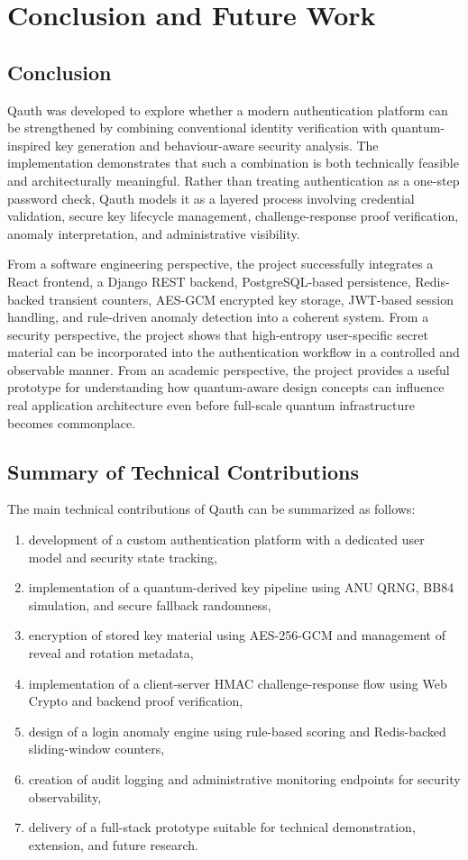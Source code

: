 \chapter{Conclusion and Future Work}

\section{Conclusion}
Qauth was developed to explore whether a modern authentication platform can be strengthened by combining conventional identity verification with quantum-inspired key generation and behaviour-aware security analysis. The implementation demonstrates that such a combination is both technically feasible and architecturally meaningful. Rather than treating authentication as a one-step password check, Qauth models it as a layered process involving credential validation, secure key lifecycle management, challenge-response proof verification, anomaly interpretation, and administrative visibility.

From a software engineering perspective, the project successfully integrates a React frontend, a Django REST backend, PostgreSQL-based persistence, Redis-backed transient counters, AES-GCM encrypted key storage, JWT-based session handling, and rule-driven anomaly detection into a coherent system. From a security perspective, the project shows that high-entropy user-specific secret material can be incorporated into the authentication workflow in a controlled and observable manner. From an academic perspective, the project provides a useful prototype for understanding how quantum-aware design concepts can influence real application architecture even before full-scale quantum infrastructure becomes commonplace.

\section{Summary of Technical Contributions}
The main technical contributions of Qauth can be summarized as follows:

\begin{enumerate}
    \item development of a custom authentication platform with a dedicated user model and security state tracking,
    \item implementation of a quantum-derived key pipeline using ANU QRNG, BB84 simulation, and secure fallback randomness,
    \item encryption of stored key material using AES-256-GCM and management of reveal and rotation metadata,
    \item implementation of a client-server HMAC challenge-response flow using Web Crypto and backend proof verification,
    \item design of a login anomaly engine using rule-based scoring and Redis-backed sliding-window counters,
    \item creation of audit logging and administrative monitoring endpoints for security observability,
    \item delivery of a full-stack prototype suitable for technical demonstration, extension, and future research.
\end{enumerate}

